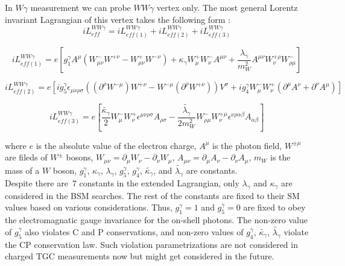 In $W\gamma$ measurement we can probe $WW\gamma$ vertex only. The most general Lorentz invariant Lagrangian of this vertex takes the following form \cite{ref_theory_aTGC}:\\

\begin{equation}\label{L_ATGC}
i L_{eff}^{WW\gamma}= i L_{eff(1)}^{WW\gamma} + i L_{eff(2)}^{WW\gamma} + i L_{eff(3)}^{WW\gamma}
\end{equation}


\begin{equation}\label{L_ATGC_1}
i L_{eff(1)}^{WW\gamma}= e [ g_1^{\gamma} A^\mu (W_{\mu\nu}^- W^{+\nu} - W_{\mu\nu}^+ W^{-\nu}) + \kappa_\gamma W_{\mu}^+ W_{\nu}^- A^{\mu\nu} + {\frac{\lambda_\gamma}{m^2_W}} A^{\mu\nu} W_\nu^{+\rho} W_{\rho\mu}^- ]
\end{equation}

\begin{equation}\label{L_ATGC_2}
i L_{eff(2)}^{WW\gamma}= e [ i g_5^\gamma \epsilon_{\mu\nu\rho\sigma}((\partial^\rho W^{-\mu})W^{+\nu} - W^{-\mu}(\partial^{\rho}W^{+\nu}))V^\sigma + i g_4^\gamma W_\mu^- W_\nu^+ (\partial^\mu A^\nu + \partial^\nu A^\mu) ]
\end{equation}

\begin{equation}\label{L_ATGC_3}
i L_{eff(3)}^{WW\gamma}= e [ \frac{\tilde{\kappa_\gamma}}{2} W_\mu^- W_\nu^+ \epsilon^{\mu\nu\rho\sigma} A_{\rho\sigma} - \frac{\tilde{\lambda_\gamma}}{2 m_W^2} W_{\rho\mu}^- W^{+\mu}_{\nu} \epsilon^{\nu\rho\alpha\beta} A_{\alpha\beta}]
\end{equation}


where $e$ is the absolute value of the electron charge, $A^\mu$ is the photon field, $W^{\pm\mu}$ are fileds of $W^\pm$ bosons, $W_{\mu\nu}=\partial_\mu W_\nu - \partial_\nu W_\mu$, $A_{\mu\nu}=\partial_\mu A_\nu - \partial_\nu A_\mu$, $m_W$ is the mass of a $W$ boson, $g_1^\gamma$, $\kappa_\gamma$, $\lambda_\gamma$, $g_5^\gamma$, $g_4^\gamma$, $\tilde{\kappa_\gamma}$, and $\tilde{\lambda_\gamma}$ are constants.\\

Despite there are~7 constants in the extended Lagrangian, only $\lambda_\gamma$ and $\kappa_\gamma$ are considered in the BSM searches. The rest of the constants are fixed to their SM values based on various considerations. Thus, $g_1^\gamma=1$ and $g_5^\gamma=0$ are fixed to obey the electromagnatic gauge invariance for the on-shell photons. The non-zero value of $g_5^\gamma$ also violates C and P conservations, and non-zero values of $g_4^\gamma$, $\tilde{\kappa_\gamma}$, $\tilde{\lambda_\gamma}$ violate the CP conservation law. Such violation parametrizations are not considered in charged TGC measurements now but might get considered in the future.\\

